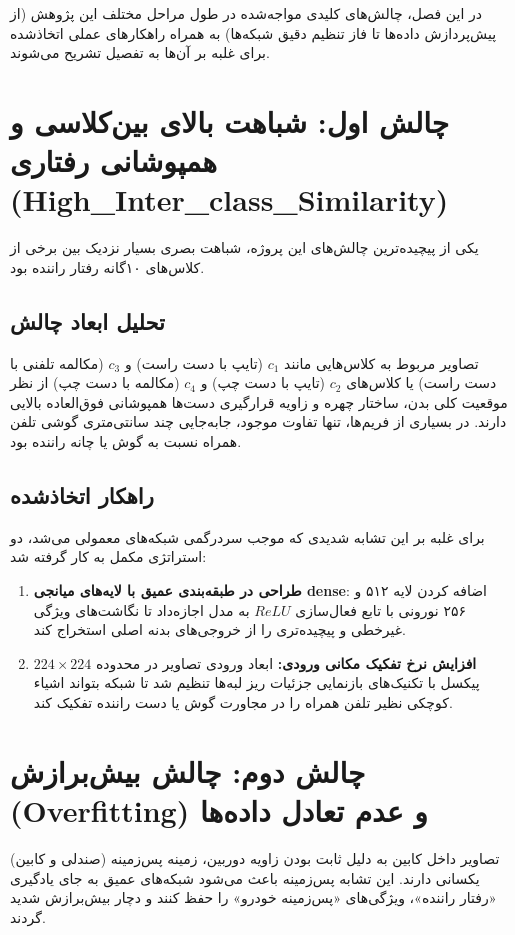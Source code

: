 \documentclass{report}
\begin{document}
 	در این فصل، چالش‌های کلیدی مواجه‌شده در طول مراحل مختلف این پژوهش (از پیش‌پردازش داده‌ها تا فاز تنظیم دقیق شبکه‌ها) به همراه راهکارهای عملی اتخاذشده برای غلبه بر آن‌ها به تفصیل تشریح می‌شوند.
 	
 	\section{چالش اول: شباهت بالای بین‌کلاسی و همپوشانی رفتاری\\ (High\_Inter\_class\_Similarity)}
 	یکی از پیچیده‌ترین چالش‌های این پروژه، شباهت بصری بسیار نزدیک بین برخی از کلاس‌های ۱۰‌گانه رفتار راننده بود. 
 	
 	\subsection{تحلیل ابعاد چالش}
 	تصاویر مربوط به کلاس‌هایی مانند $c_1$ (تایپ با دست راست) و $c_3$ (مکالمه تلفنی با دست راست) یا کلاس‌های $c_2$ (تایپ با دست چپ) و $c_4$ (مکالمه با دست چپ) از نظر موقعیت کلی بدن، ساختار چهره و زاویه قرارگیری دست‌ها همپوشانی فوق‌العاده بالایی دارند. در بسیاری از فریم‌ها، تنها تفاوت موجود، جابه‌جایی چند سانتی‌متری گوشی تلفن همراه نسبت به گوش یا چانه راننده بود.
 	
 	\subsection{راهکار اتخاذشده}
 	برای غلبه بر این تشابه شدیدی که موجب سردرگمی شبکه‌های معمولی می‌شد، دو استراتژی مکمل به کار گرفته شد:
 	\begin{enumerate}
 		\item \textbf{طراحی در طبقه‌بندی عمیق با لایه‌های میانجی dense}: اضافه کردن لایه ۵۱۲ و ۲۵۶ نورونی با تابع فعال‌سازی $ReLU$ به مدل اجازه‌داد تا نگاشت‌های ویژگی غیرخطی و پیچیده‌تری را از خروجی‌های بدنه اصلی استخراج کند.
 		\item \textbf{افزایش نرخ تفکیک مکانی ورودی:} ابعاد ورودی تصاویر در محدوده $224 \times 224$ پیکسل با تکنیک‌های بازنمایی جزئیات ریز لبه‌ها تنظیم شد تا شبکه بتواند اشیاء کوچکی نظیر تلفن همراه را در مجاورت گوش یا دست راننده تفکیک کند.
 	\end{enumerate}
 	
 	\section{چالش دوم: چالش بیش‌برازش (Overfitting) و عدم تعادل داده‌ها}
 	تصاویر داخل کابین به دلیل ثابت بودن زاویه دوربین، زمینه پس‌زمینه (صندلی و کابین) یکسانی دارند. این تشابه پس‌زمینه باعث می‌شود شبکه‌های عمیق به جای یادگیری «رفتار راننده»، ویژگی‌های «پس‌زمینه خودرو» را حفظ کنند و دچار بیش‌برازش شدید گردند.
 	
\end{document}
